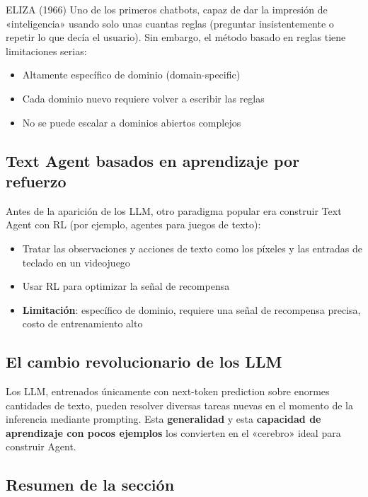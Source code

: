 \documentclass[a4paper]{article}
\begin{document}
\begin{knowledgebox}{ELIZA (1966)}
Uno de los primeros chatbots, capaz de dar la impresión de «inteligencia» usando solo unas cuantas reglas (preguntar insistentemente o repetir lo que decía el usuario). Sin embargo, el método basado en reglas tiene limitaciones serias:
\begin{itemize}
    \item Altamente específico de dominio (domain-specific)
    \item Cada dominio nuevo requiere volver a escribir las reglas
    \item No se puede escalar a dominios abiertos complejos
\end{itemize}
\end{knowledgebox}

\subsection{Text Agent basados en aprendizaje por refuerzo}

Antes de la aparición de los LLM, otro paradigma popular era construir Text Agent con RL (por ejemplo, agentes para juegos de texto):

\begin{itemize}
    \item Tratar las observaciones y acciones de texto como los píxeles y las entradas de teclado en un videojuego
    \item Usar RL para optimizar la señal de recompensa
    \item \textbf{Limitación}: específico de dominio, requiere una señal de recompensa precisa, costo de entrenamiento alto
\end{itemize}

\subsection{El cambio revolucionario de los LLM}

Los LLM, entrenados únicamente con next-token prediction sobre enormes cantidades de texto, pueden resolver diversas tareas nuevas en el momento de la inferencia mediante prompting. Esta \textbf{generalidad} y esta \textbf{capacidad de aprendizaje con pocos ejemplos} los convierten en el «cerebro» ideal para construir Agent.

\subsection{Resumen de la sección}
\end{document}
